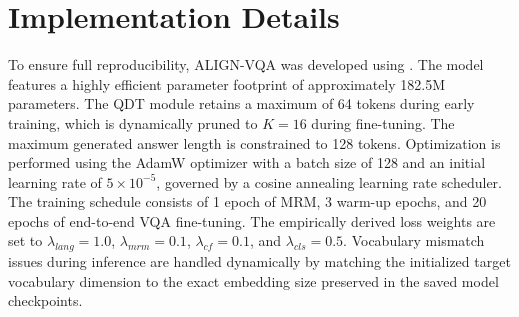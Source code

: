 \section{Implementation Details}
To ensure full reproducibility, ALIGN-VQA was developed using \cite{pytorch}. The model features a highly efficient parameter footprint of approximately 182.5M parameters. The QDT module retains a maximum of 64 tokens during early training, which is dynamically pruned to $K=16$ during fine-tuning. The maximum generated answer length is constrained to 128 tokens. Optimization is performed using the AdamW optimizer with a batch size of 128 and an initial learning rate of $5 \times 10^{-5}$, governed by a cosine annealing learning rate scheduler. The training schedule consists of 1 epoch of MRM, 3 warm-up epochs, and 20 epochs of end-to-end VQA fine-tuning. The empirically derived loss weights are set to $\lambda_{lang}=1.0$, $\lambda_{mrm}=0.1$, $\lambda_{cf}=0.1$, and $\lambda_{cls}=0.5$. Vocabulary mismatch issues during inference are handled dynamically by matching the initialized target vocabulary dimension to the exact embedding size preserved in the saved model checkpoints.
